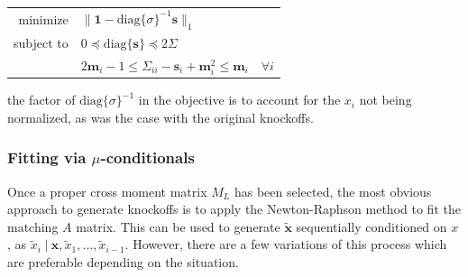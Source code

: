 \documentclass[11pt]{article}
\newcommand{\diag}[1]{\mathrm{diag}\{#1\}}
\newcommand{\st}{ \; \big | \:}
\theoremstyle{definition}
\begin{document}
            \begin{center}
                \begin{tabular}{r l}
                    minimize & $\|\mathbf 1-\diag{\sigma}^{-1}\mathbf s\|_1$ \\
                    subject to & $ 0 \preceq \diag{\mathbf s} \preceq 2\Sigma $ \\
                               & $ 2\mathbf m_i -1 \leq \Sigma_{ii}-\mathbf s_i + \mathbf m_i^2 \leq \mathbf m_i  \quad \forall i$
                \end{tabular} 
            \end{center} 
            the factor of $\diag{\sigma}^{-1}$ in the objective is to account for the $x_i$ not being normalized, as was the case with the original knockoffs. \par
\subsubsection{Fitting via $\mu$-conditionals}
        Once a proper cross moment matrix $M_L$ has been selected, the most obvious approach to generate knockoffs is to apply the Newton-Raphson method to fit the matching $A$ matrix. This can be used to generate $\mathbf{ \tilde x}$ sequentially conditioned on $x$, as $\tilde x_i \st \mathbf x,\tilde x_1,\ldots,\tilde x_{i-1}$. However, there are a few variations of this process which are preferable depending on the situation. 
\end{document}
